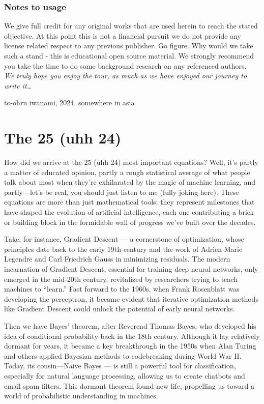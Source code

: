 \documentclass[
  12 pt,
  a4paper,
]{book}
\numberwithin{equation}{section}
\theoremstyle{plain}      %
\theoremstyle{definition} %
\theoremstyle{remark}     %
\theoremstyle{note}         %
\begin{document}
\hypertarget{notes-to-usage}{%
\subsection*{Notes to usage}\label{notes-to-usage}}

We give full credit for any original works that are used herein to reach
the stated objective. At this point this is not a financial pursuit we
do not provide any license related respect to any previous publisher. Go
figure. Why would we take such a stand - this is educational open source
material. We strongly recommend you take the time to do some background
research on any referenced authors.\\

\emph{We truly hope you enjoy the tour, as much as we have enjoyed our
journey to write it\ldots{}}

to-ohru iwanami, 2024, somewhere in asia

\hypertarget{the-25-uhh-24}{%
\chapter{The 25 (uhh 24)}\label{the-25-uhh-24}}

How did we arrive at the 25 (uhh 24) most important equations? Well,
it's partly a matter of educated opinion, partly a rough statistical
average of what people talk about most when they're exhilarated by the
magic of machine learning, and partly---let's be real, you should just
listen to me (fully joking here). These equations are more than just
mathematical tools; they represent milestones that have shaped the
evolution of artificial intelligence, each one contributing a brick or
building block in the formidable wall of progress we've built over the
decades.

Take, for instance, Gradient Descent --- a cornerstone of optimization,
whose principles date back to the early 19th century and the work of
Adrien-Marie Legendre and Carl Friedrich Gauss in minimizing residuals.
The modern incarnation of Gradient Descent, essential for training deep
neural networks, only emerged in the mid-20th century, revitalized by
researchers trying to teach machines to ``learn.'' Fast forward to the
1960s, when Frank Rosenblatt was developing the perceptron, it became
evident that iterative optimization methods like Gradient Descent could
unlock the potential of early neural networks.

Then we have Bayes' theorem, after Reverend Thomas Bayes, who developed
his idea of conditional probability back in the 18th century. Although
it lay relatively dormant for years, it became a key breakthrough in the
1950s when Alan Turing and others applied Bayesian methods to
codebreaking during World War II. Today, its cousin---Naive Bayes --- is
still a powerful tool for classification, especially for natural
language processing, allowing us to create chatbots and email spam
filters. This dormant theorem found new life, propelling us toward a
world of probabilistic understanding in machines.
\end{document}
